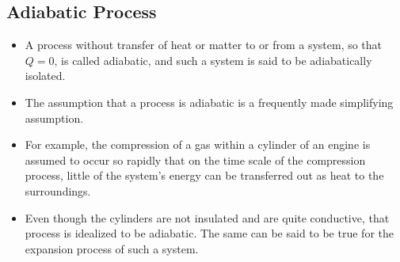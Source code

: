 \documentclass[]{article}
\begin{document}
\subsection{Adiabatic Process}
\begin{itemize}
\item A process without transfer of heat or matter to or from a system, so that $Q = 0$, is called adiabatic, and such a system is said to be adiabatically isolated. 
\item The assumption that a process is adiabatic is a frequently made simplifying assumption. 
\item For example, the compression of a gas within a cylinder of an engine is assumed to occur so rapidly that on the time scale of the compression process, little of the system's energy can be transferred out as heat to the surroundings. 
\item Even though the cylinders are not insulated and are quite conductive, that process is idealized to be adiabatic. The same can be said to be true for the expansion process of such a system. 

\end{itemize}
\end{document}
